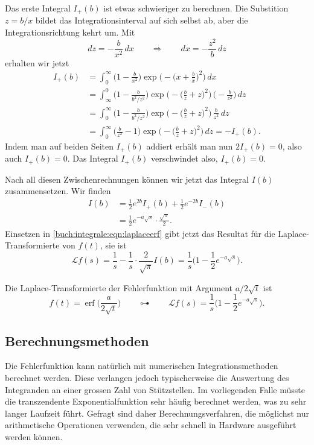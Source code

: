 Das erste Integral $I_+(b)$ ist etwas schwieriger zu berechnen.
Die Substition $z=b/x$ bildet das Integrationsinterval auf sich selbst ab,
aber die Integrationsrichtung kehrt um.
Mit
\[
dz = -\frac{b}{x^2}\,dx
\qquad\Rightarrow\qquad
dx = -\frac{z^2}{b}\,dz
\]
erhalten wir jetzt
\begin{align*}
I_+(b)
&=
\int_0^\infty
\biggl(1-\frac{b}{x^2}\biggr)
\exp\biggl(-\biggl(x+\frac{b}{x}\biggr)^2\biggr)\,dx
\\
&=
\int_{\infty}^0
\biggl(1-\frac{b}{b^2/z^2}\biggr)
\exp\biggl(-\biggl(\frac{b}{z}+z\biggr)^2\biggr)\,
\biggl(-\frac{b}{z^2}\biggr)\,dz
\\
&=
\int_{0}^{\infty}
\biggl(1-\frac{b}{b^2/z^2}\biggr)
\exp\biggl(-\biggl(\frac{b}{z}+z\biggr)^2\biggr)\,
\frac{b}{z^2}\,dz
\\
&=
\int_{0}^{\infty}
\biggl(\frac{b}{z^2}-1\biggr)
\exp\biggl(-\biggl(\frac{b}{z}+z\biggr)^2\biggr)\,
dz
=
-I_+(b).
\end{align*}
Indem man auf beiden Seiten $I_+(b)$ addiert erhält man nun $2I_+(b)=0$,
also auch $I_+(b)=0$.
Das Integral $I_+(b)$ verschwindet also, $I_+(b)=0$.

Nach all diesen Zwischenrechnungen können wir jetzt das Integral $I(b)$
zusammensetzen.
Wir finden
\begin{align*}
I(b)
&=
\frac12e^{2b} I_+(b) +\frac12e^{-2b} I_-(b)
\\
&=
\frac12e^{-a\sqrt{s}}\cdot \frac{\sqrt{\pi}}{2}.
\end{align*}
Einsetzen in \eqref{buch:integrale:eqn:laplaceerf} gibt jetzt das
Resultat für die Laplace-Transformierte von $f(t)$, sie ist
\[
\mathscr{L}f(s)
=
\frac1s - \frac1s\cdot\frac{2}{\sqrt{\pi}} I(b)
=
\frac1s\biggl(1-\frac12e^{-a\sqrt{s}} \biggr).
\]

\begin{satz} Die Laplace-Transformierte der Fehlerfunktion mit Argument
$a/2\sqrt{t}$ ist
\begin{equation}
f(t) = \operatorname{erf}\biggl(\frac{a}{2\sqrt{t}}\biggr)
\qquad\multimapdotbothA\qquad
\mathscr{L}f(s)
=
\frac1s\biggl(1-\frac12e^{-a\sqrt{s}}\biggr).
\end{equation}
\end{satz}




\subsection{Berechnungsmethoden}
Die Fehlerfunktion kann natürlich mit numerischen Integrationsmethoden
berechnet werden.
Diese verlangen jedoch typischerweise die Auswertung des Integranden
an einer grossen Zahl von Stützstellen.
Im vorliegenden Falle müsste die transzendente Exponentialfunktion
sehr häufig berechnet werden, was zu sehr langer Laufzeit führt.
Gefragt sind daher Berechnungsverfahren, die möglichst nur arithmetische
Operationen verwenden, die sehr schnell in Hardware ausgeführt werden
können.

